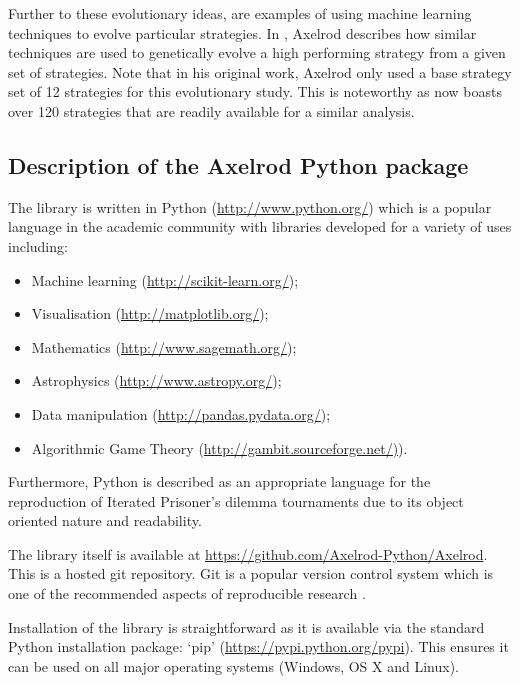 \documentclass{article}
\begin{document}
Further to these evolutionary ideas, \cite{Chellapilla1999, DavidB1993} are
examples of using machine learning techniques to evolve particular strategies.
In \cite{Axelrod}, Axelrod describes how similar techniques are used to
genetically evolve a high performing strategy from a given set of strategies.
Note that in his original work, Axelrod only used a base strategy set of 12
strategies for this evolutionary study. This is noteworthy as
\cite{Axelrod-Pythonprojectteam2015} now boasts over 120 strategies that are
readily available for a similar analysis.

\subsection{Description of the Axelrod Python package}\label{sec:description-of-axelrod-python}

The library is written in Python (\url{http://www.python.org/}) which is a
popular language in the academic community with libraries developed for a
variety of uses including:

\begin{itemize}
    \item Machine learning (\url{http://scikit-learn.org/});
    \item Visualisation (\url{http://matplotlib.org/});
    \item Mathematics (\url{http://www.sagemath.org/});
    \item Astrophysics (\url{http://www.astropy.org/});
    \item Data manipulation (\url{http://pandas.pydata.org/});
    \item Algorithmic Game Theory (\url{http://gambit.sourceforge.net/)}).
\end{itemize}

Furthermore, \cite{Isaac2008} Python is described as an appropriate language for the
reproduction of Iterated Prisoner's dilemma tournaments due to its object
oriented nature and readability.

The library itself is available at
\url{https://github.com/Axelrod-Python/Axelrod}. This is a hosted git
repository. Git is a popular version control system which is one of the
recommended aspects of reproducible research \cite{Crick2014a, Sandve2013}.

Installation of the library is straightforward as it is available via the
standard Python installation package: `pip'
(\url{https://pypi.python.org/pypi}). This ensures it can be used on all major
operating systems (Windows, OS X and Linux).
\end{document}
